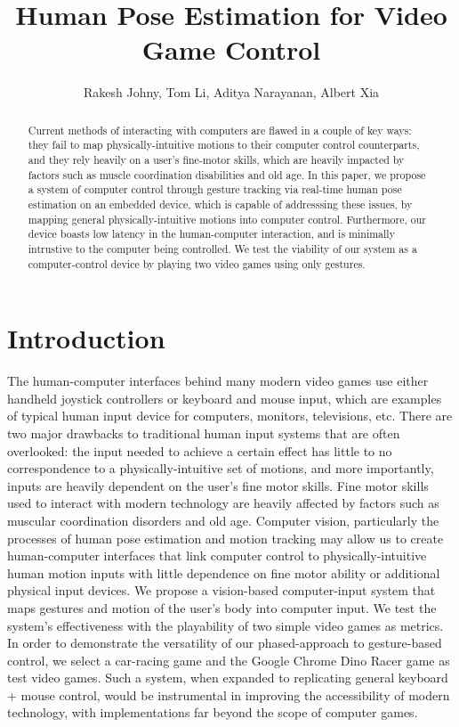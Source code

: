 \documentclass[10pt,twocolumn,letterpaper]{article}
\begin{document}
\title{Human Pose Estimation for Video Game Control}
\author{Rakesh Johny, Tom Li, Aditya Narayanan, Albert Xia}
\maketitle

\begin{abstract}
    Current methods of interacting with computers are flawed in a 
    couple of key ways: they fail to map physically-intuitive motions to their computer 
    control counterparts, and they rely heavily on a user's fine-motor skills, 
    which are heavily impacted by factors such as muscle coordination disabilities 
    and old age. In this paper, we propose a system of computer control through 
    gesture tracking via real-time human pose estimation on an embedded device, 
    which is capable of addresssing these issues, by mapping general physically-intuitive 
    motions into computer control. Furthermore, our device boasts low latency in 
    the human-computer interaction, and is minimally intrustive to the computer being 
    controlled. We test the viability of our system as a computer-control device by playing two 
    video games using only gestures.
\end{abstract}

\section{Introduction}
The human-computer interfaces behind many modern video games use either handheld 
joystick controllers or keyboard and mouse input, which are examples
of typical human input device for computers, monitors, televisions, etc. There are two 
major drawbacks to traditional human input systems that are often overlooked: the input needed 
to achieve a certain effect has little to no correspondence to a physically-intuitive set 
of motions, and more importantly, inputs are heavily dependent on the user's fine motor skills. 
Fine motor skills used to interact with modern technology are heavily affected by factors such 
as muscular coordination disorders and old age. Computer vision, particularly the processes 
of human pose estimation and motion tracking may allow us to create human-computer interfaces 
that link computer control to physically-intuitive human motion inputs with little dependence on 
fine motor ability or additional physical input devices. We propose a vision-based computer-input 
system that maps gestures and motion of the user's body into computer input. We test the system's 
effectiveness with the playability of two simple video games as metrics. In order to demonstrate 
the versatility of our phased-approach to gesture-based control, we select a car-racing game and 
the Google Chrome Dino Racer game as test video games. Such a system, when expanded to replicating 
general keyboard + mouse control, would be instrumental in improving the accessibility of 
modern technology, with implementations far beyond the scope of computer games.
\end{document}
